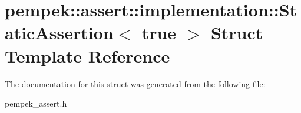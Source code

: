 \hypertarget{structpempek_1_1assert_1_1implementation_1_1_static_assertion_3_01true_01_4}{}\section{pempek\+:\+:assert\+:\+:implementation\+:\+:Static\+Assertion$<$ true $>$ Struct Template Reference}
\label{structpempek_1_1assert_1_1implementation_1_1_static_assertion_3_01true_01_4}


The documentation for this struct was generated from the following file\+:\begin{DoxyCompactItemize}
\item 
pempek\+\_\+assert.\+h\end{DoxyCompactItemize}
